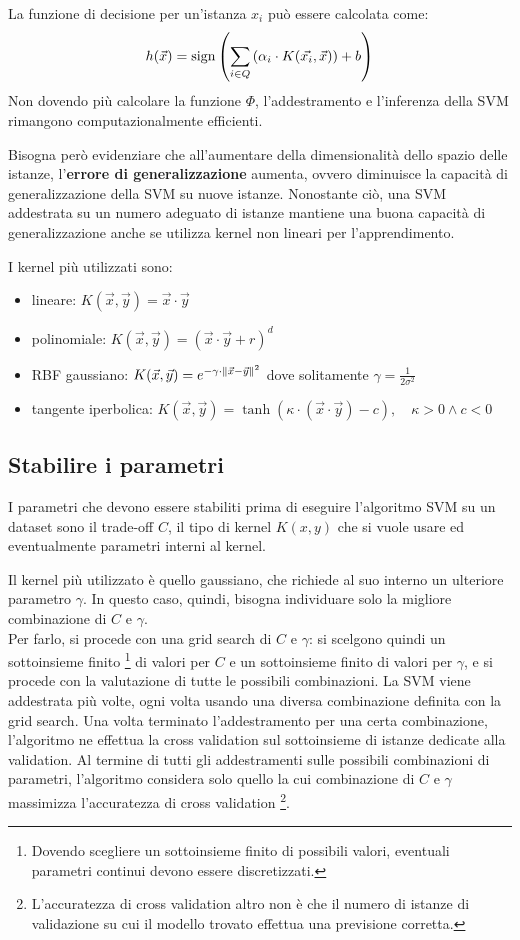La funzione di decisione per un'istanza $x_i$ può essere calcolata come:
\[
    h(\Vec{x}) = \textnormal{sign} \left(\sum\limits_{i \in Q} \left(\alpha_i \cdot K(\Vec{x_i}, \Vec{x})\right) + b\right)
\]
Non dovendo più calcolare la funzione $\Phi$, l'addestramento e l'inferenza della SVM rimangono computazionalmente efficienti.

Bisogna però evidenziare che all'aumentare della dimensionalità dello spazio delle istanze, l'\textbf{errore di generalizzazione} aumenta, ovvero diminuisce la capacità di generalizzazione della SVM su nuove istanze. Nonostante ciò, una SVM addestrata su un numero adeguato di istanze mantiene una buona capacità di generalizzazione anche se utilizza kernel non lineari per l'apprendimento.

I kernel più utilizzati sono:
\begin{itemize}
    \item lineare: $K(\Vec{x}, \Vec{y}) = \Vec{x} \cdot \Vec{y}$
    \item polinomiale: $K(\Vec{x}, \Vec{y}) = (\Vec{x} \cdot \Vec{y} + r)^d$
    \item RBF gaussiano: $K(\Vec{x}, \Vec{y}) = e^{-\gamma \cdot \left\lVert\Vec{x} - \Vec{y}\right\rVert^2}$ dove solitamente $\gamma = \frac{1}{2\sigma^2}$
    \item tangente iperbolica: $K(\Vec{x}, \Vec{y}) = \tanh (\kappa \cdot (\Vec{x} \cdot \Vec{y}) - c), \quad \kappa > 0 \land c < 0$
\end{itemize}

\subsection{Stabilire i parametri}
I parametri che devono essere stabiliti prima di eseguire l'algoritmo SVM su un dataset sono il trade-off $C$, il tipo di kernel $K(x, y)$ che si vuole usare ed eventualmente parametri interni al kernel.

Il kernel più utilizzato è quello gaussiano, che richiede al suo interno un ulteriore parametro $\gamma$. In questo caso, quindi, bisogna individuare solo la migliore combinazione di $C$ e $\gamma$.\\
Per farlo, si procede con una grid search di $C$ e $\gamma$: si scelgono quindi un sottoinsieme finito \footnote{Dovendo scegliere un sottoinsieme finito di possibili valori, eventuali parametri continui devono essere discretizzati.} di valori per $C$ e un sottoinsieme finito di valori per $\gamma$, e si procede con la valutazione di tutte le possibili combinazioni.
La SVM viene addestrata più volte, ogni volta usando una diversa combinazione definita con la grid search.
Una volta terminato l'addestramento per una certa combinazione, l'algoritmo ne effettua la cross validation sul sottoinsieme di istanze dedicate alla validation.
Al termine di tutti gli addestramenti sulle possibili combinazioni di parametri, l'algoritmo considera solo quello la cui combinazione di $C$ e $\gamma$ massimizza l'accuratezza di cross validation \footnote{L'accuratezza di cross validation altro non è che il numero di istanze di validazione su cui il modello trovato effettua una previsione corretta.}.


